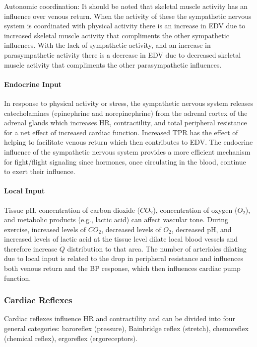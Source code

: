 Autonomic coordination: It should be noted that skeletal muscle activity has an influence over venous return. When the activity of these the sympathetic nervous system is coordinated with physical activity there is an increase in EDV due to increased skeletal muscle activity that compliments the other sympathetic influences. With the lack of sympathetic activity, and an increase in parasympathetic activity there is a decrease in EDV due to decreased skeletal muscle activity that compliments the other parasympathetic influences. 

\paragraph{Endocrine Input}
In response to physical activity or stress, the sympathetic nervous system releases catecholamines (epinephrine and norepinephrine) from the adrenal cortex of the adrenal glands which increases HR, contractility, and total peripheral resistance for a net effect of increased cardiac function. Increased TPR has the effect of helping to facilitate venous return which then contributes to EDV. The endocrine influence of the sympathetic nervous system provides a more efficient mechanism for fight/flight signaling since hormones, once circulating in the blood, continue to exert their influence. 

\paragraph{Local Input}
Tissue pH, concentration of carbon dioxide ($CO_2$), concentration of oxygen ($O_2$), and metabolic products (e.g., lactic acid) can affect vascular tone. During exercise, increased levels of $CO_2$, decreased levels of $O_2$, decreased pH, and increased levels of lactic acid at the tissue level dilate local blood vessels and therefore increase $\dot{Q}$ distribution to that area. The number of arterioles dilating due to local input is related to the drop in peripheral resistance and influences both venous return and the BP response, which then influences cardiac pump function. 

\subsubsection{Cardiac Reflexes}
Cardiac reflexes influence HR and contractility and can be divided into four general categories: baroreflex (pressure), Bainbridge reflex (stretch), chemoreflex (chemical reflex), ergoreflex (ergoreceptors). 

